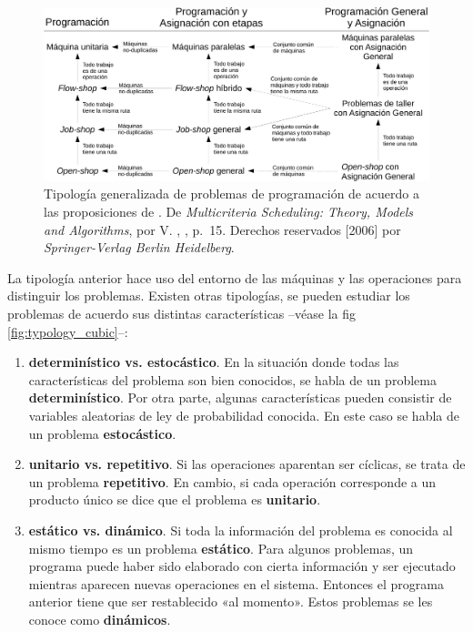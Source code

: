 \documentclass[spanish,draft,12pt,headsepline,footsepline,paper=letter]{scrreprt}
\begin{document}
\begin{figure}[hbtp]
\centering
\includegraphics[width=.8\textwidth]{media/typology_maccarthy_spanish.pdf}
\caption[Tipología basada en el contexto de máquinas y operaciones]{Tipología generalizada de problemas de programación de acuerdo a las proposiciones de \citet{maccarthy1993addressing}. De \textit{Multicriteria Scheduling: Theory, Models and Algorithms}, por V. \citeauthor{TKindt2002}, \citeyear{TKindt2002}, p.~15. Derechos reservados [2006] por \textit{Springer-Verlag Berlin Heidelberg}.}
\label{fig:typology_maccarthy}
\end{figure}

La tipología anterior hace uso del entorno de las máquinas y las operaciones para distinguir los problemas. Existen otras tipologías, se pueden estudiar los problemas de acuerdo sus distintas características –véase la fig \ref{fig:typology_cubic}–:

\begin{enumerate}[1]
\item \textbf{determinístico vs. estocástico}. En la situación donde todas las características del problema son bien conocidos, se habla de un problema \textbf{determinístico}. Por otra parte, algunas características pueden consistir de variables aleatorias de ley de probabilidad conocida. En este caso se habla de un problema \textbf{estocástico}.
\item \textbf{unitario vs. repetitivo}. Si las operaciones aparentan ser cíclicas, se trata de un problema \textbf{repetitivo}. En cambio, si cada operación corresponde a un producto único se dice que el problema es \textbf{unitario}.
\item \textbf{estático vs. dinámico}. Si toda la información del problema es conocida al mismo tiempo es un problema \textbf{estático}. Para algunos problemas, un programa puede haber sido elaborado con cierta información y ser ejecutado mientras aparecen nuevas operaciones en el sistema. Entonces el programa anterior tiene que ser restablecido «al momento». Estos problemas se les conoce como \textbf{dinámicos}.
\end{enumerate}
\end{document}
